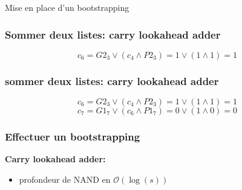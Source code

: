 \documentclass[10pt,xcolor={usenames,dvipsnames}]{beamer}
\begin{document}
\begin{section}{Mise en place d'un bootstrapping}

\begin{frame} 
\frametitle{Sommer deux listes: carry lookahead adder}
  \begin{figure}
    \begin{center}
      \begin{tikzpicture}[scale = 0.7, transform shape]
      	
      \end{tikzpicture}
    \end{center}
  \end{figure}
\[c_6 = G2_3 \vee \left( c_4 \wedge P2_3\right) = 1 \vee \left( 1 \wedge 1 \right) = 1 \]
\[\quad\]
\end{frame} 


\begin{frame} 
\frametitle{sommer deux listes: carry lookahead adder}
  \begin{figure}
    \begin{center}
      \begin{tikzpicture}[scale = 0.7, transform shape]
      	
      \end{tikzpicture}
    \end{center}
  \end{figure}
\[c_6 = G2_3 \vee \left( c_4 \wedge P2_3\right) = 1 \vee \left( 1 \wedge 1 \right) = 1 \]
\[c_7 = G1_7 \vee \left( c_6 \wedge P1_7\right) = 0 \vee \left( 1 \wedge 0 \right) = 0 \]
\end{frame} 




\begin{frame} 
\frametitle{Effectuer un bootstrapping}



\textbf{Carry lookahead adder:}
\begin{itemize}
\item profondeur de NAND  en $\mathcal{O}(\log(s))$
\end{itemize}


\end{frame}
\end{section}
\end{document}
